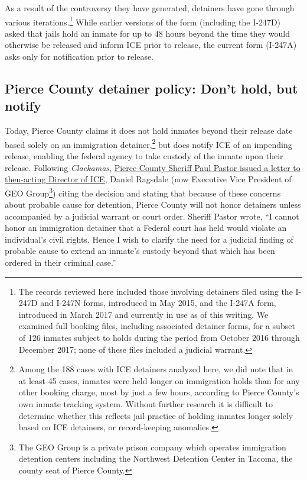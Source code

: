 \documentclass[12pt]{report}\usepackage[]{graphicx}\usepackage[]{color}
\begin{document}
As a result of the controversy they have generated, detainers have gone through various iterations.\footnote{The records reviewed here included those involving detainers filed using the I-247D and I-247N forms, introduced in May 2015, and the I-247A form, introduced in March 2017 and currently in use as of this writing. We examined full booking files, including associated detainer forms, for a subset of 126 inmates subject to holds during the period from October 2016 through December 2017; none of these files included a judicial warrant.} While earlier versions of the form (including the I-247D) asked that jails hold an inmate for up to 48 hours beyond the time they would otherwise be released and inform ICE prior to release, the current form (I-247A) asks only for notification prior to release.

\subsection*{Pierce County detainer policy: Don't hold, but notify}

Today, Pierce County claims it does not hold inmates beyond their release date based solely on an immigration detainer,\footnote{Among the 188 cases with ICE detainers analyzed here, we did note that in at least 45 cases, inmates were held longer on immigration holds than for any other booking charge, most by just a few hours, according to Pierce County's own inmate tracking system. Without further research it is difficult to determine whether this reflects jail practice of holding inmates longer solely based on ICE detainers, or record-keeping anomalies.} but does notify ICE of an impending release, enabling the federal agency to take custody of the inmate upon their release. Following \emph{Clackamas}, \href{https://www.ilrc.org/sites/default/files/resources/pierce_county.pdf}{Pierce County Sheriff Paul Pastor issued a letter to then-acting Director of ICE}, Daniel Ragsdale (now Executive Vice President of GEO Group\footnote{The GEO Group is a private prison company which operates immigration detention centers including the Northwest Detention Center in Tacoma, the county seat of Pierce County.}) citing the decision and stating that because of these concerns about probable cause for detention, Pierce County will not honor detainers unless accompanied by a judicial warrant or court order. Sheriff Pastor wrote, ``I cannot honor an immigration detainer that a Federal court has held would violate an individual's civil rights. Hence I wish to clarify the need for a judicial finding of probable cause to extend an inmate's custody beyond that which has been ordered in their criminal case.''
\end{document}
